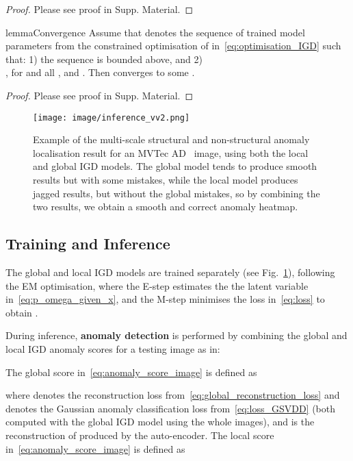 \documentclass[letterpaper]{article} \usepackage{aaai22}  \usepackage{times}  \usepackage{helvet}  \usepackage{courier}  \usepackage[hyphens]{url}  \usepackage{graphicx} \urlstyle{rm} \def\UrlFont{\rm}  \usepackage{natbib}  \usepackage{caption} \DeclareCaptionStyle{ruled}{labelfont=normalfont,labelsep=colon,strut=off} \frenchspacing  \setlength{\pdfpagewidth}{8.5in}  \setlength{\pdfpageheight}{11in}  \usepackage{algorithm}
\begin{document}
\begin{proof}
Please see proof in Supp. Material.
\end{proof}


\begin{restatable}[]{lemma}{Convergence}
    \label{thm:convergence}
    Assume that  denotes the sequence of trained model parameters from the constrained optimisation of  in~\eqref{eq:optimisation_IGD} such that: 1) the sequence  is bounded above, and 2) 
    \scalebox{0.79}{} \\
    \scalebox{0.8}{
    }, 
    for  and all , and .  
    Then  converges to some .
 \end{restatable}
 
\begin{proof}
Please see proof in Supp. Material.
\end{proof}


\begin{figure}[htp]
    \centering
    \texttt{[image: image/inference\_vv2.png]}
   \caption{Example of the multi-scale structural and non-structural anomaly localisation result for an MVTec AD~\cite{mvtecad} image, using both the local and global IGD models. The global model tends to produce smooth results but with some mistakes, while the local model produces jagged results, but without the global mistakes, so by combining the two results, we obtain a smooth and correct anomaly heatmap.  }
    \label{fig:multi-test}
\end{figure}

\subsection{Training and Inference}

The global and local IGD models are trained separately (see Fig.~\ref{fig:multi-test}), following the EM optimisation, where the E-step estimates the the latent variable  in~\eqref{eq:p_omega_given_x}, and the M-step minimises the loss in~\eqref{eq:loss} to obtain .  


During inference, \textbf{anomaly detection} is performed by combining the global and local IGD anomaly scores for a testing image  as in:

The global score in~\eqref{eq:anomaly_score_image} is defined as

where  denotes the reconstruction loss from~\eqref{eq:global_reconstruction_loss} and  denotes the Gaussian anomaly classification loss from~\eqref{eq:loss_GSVDD} (both computed with the global IGD model using the whole images), and  is the reconstruction of  produced by the auto-encoder.  The local score in~\eqref{eq:anomaly_score_image} is defined as
\end{document}
